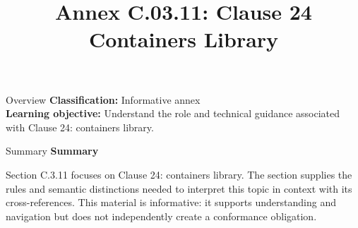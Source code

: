 \documentclass[10pt,letterpaper]{article}
\title{Annex C.03.11: Clause 24 Containers Library}
\author{}
\date{}
\begin{document}
\maketitle
\begin{CornellOverviewBox}{Overview}
\textbf{Classification:} Informative annex\\[2pt]
\textbf{Learning objective:} Understand the role and technical guidance associated with Clause 24: containers library.
\end{CornellOverviewBox}\begin{CornellSummaryBox}{Summary}
{\sffamily\bfseries\color{Accent} Summary}\par\vspace{3pt}Section C.3.11 focuses on Clause 24: containers library. The section supplies the rules and semantic distinctions needed to interpret this topic in context with its cross-references. This material is informative: it supports understanding and navigation but does not independently create a conformance obligation.
\end{CornellSummaryBox}
\end{document}
